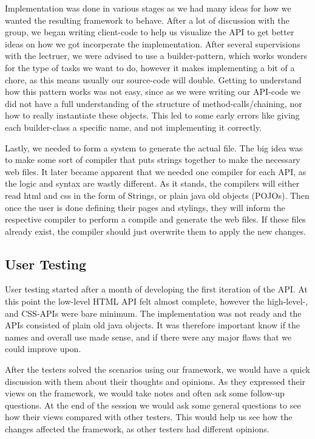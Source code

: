 \documentclass[12pt]{article}
\begin{document}
    Implementation was done in various stages as we had many ideas for how we wanted the resulting framework to behave. After a lot of discussion with the group, we began writing client-code to help us visualize the API to get better ideas on how we got incorperate the implementation. After several supervisions with the lectruer, we were advised to use a builder-pattern, which works wonders for the type of tasks we want to do, however it makes implementing a bit of a chore, as this means usually our source-code will double. Getting to understand how this pattern works was not easy, since as we were writing our API-code we did not have a full understanding of the structure of method-calls/chaining, nor how to really instantiate these objects. This led to some early errors like giving each builder-class a specific name, and not implementing it correctly.


    Lastly, we needed to form a system to generate the actual file. The big idea was to make some sort of compiler that puts strings together to make the necessary web files. It later became apparent that we needed one compiler for each API, as the logic and syntax are wastly different. As it stands, the compilers will either read html and css in the form of Strings, or plain java old objects (POJOs). Then once the user is done defining their pages and stylings, they will inform the respective compiler to perform a compile and generate the web files. If these files already exist, the compiler should just overwrite them to apply the new changes.


    \subsection{User Testing}

    User testing started after a month of developing the first iteration of the API. At this point the low-level HTML API felt almost complete, however the high-level-, and CSS-APIs were bare minimum. The implementation was not ready and the APIs consisted of plain old java objects. It was therefore important know if the names and overall use made sense, and if there were any major flaws that we could improve upon.

    After the testers solved the scenarios using our framework, we would have a quick discussion with them about their thoughts and opinions. As they expressed their views on the framework, we would take notes and often ask some follow-up questions. At the end of the session we would ask some general questions to see how their views compared with other testers. This would help us see how the changes affected the framework, as other testers had different opinions.
\end{document}
